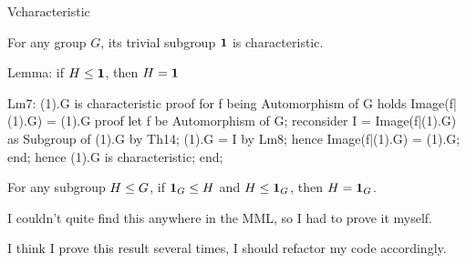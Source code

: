 \nwenddocs{}\plusendmoddef\nwstartdeflinemarkup{}\nwenddeflinemarkup
Vcharacteristic
\nwendcode{}\nwdocspar



\begin{lemma}
  For any group $G$, its trivial subgroup $\mathbf{1}$ is characteristic.
\end{lemma}

\nwenddocs{}\endmoddef\nwstartdeflinemarkup{}\nwenddeflinemarkup
\LA{}Lemma: if $H\leq\mathbf{1}$, then $H=\mathbf{1}$~{\nwtagstyle{}}\RA{}

Lm7: (1).G is characteristic
proof
  for f being Automorphism of G holds Image(f|(1).G) = (1).G
  proof
    let f be Automorphism of G;
    reconsider I = Image(f|(1).G) as Subgroup of (1).G by Th14;
    (1).G = I by Lm8;
    hence Image(f|(1).G) = (1).G;
  end;
  hence (1).G is characteristic;
end;
\eatline
{}\nwendcode{}\nwdocspar
\begin{lemma}
For any subgroup $H\leq G$, if $\mathbf{1}_{G}\leq H$
and $H\leq\mathbf{1}_{G}$, then $H=\mathbf{1}_{G}$.
\end{lemma}

\begin{lem-remark}
I couldn't quite find this anywhere in the MML, so I had to prove it
myself.
\end{lem-remark}
\begin{lem-remark}[To do]
I think I prove this result several times, I should refactor my code accordingly.
\end{lem-remark}

